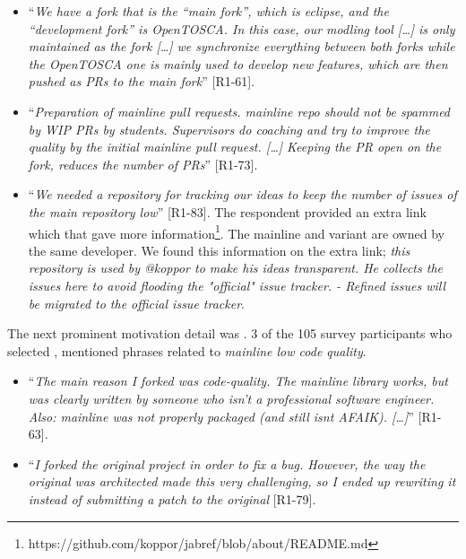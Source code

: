 \begin{itemize}[leftmargin=*]
\item ``\emph{We have a fork that is the ``main fork'', which is eclipse, and the ``development fork'' is OpenTOSCA. In this case, our modling tool [\ldots] is only maintained as the fork [\ldots] we synchronize everything between both forks while the OpenTOSCA one is mainly used to develop new features, which are then pushed as PRs to the main fork}'' [R1-61].

\item ``\emph{Preparation of mainline pull requests. mainline repo should not be spammed by WIP PRs by students. Supervisors do coaching and try to improve the quality by the initial mainline pull request. [\dots] Keeping the PR open on the fork, reduces the number of PRs}'' [R1-73].

\item ``\emph{We needed a repository for tracking our ideas to keep the number of issues of the main repository low}'' [R1-83]. The respondent provided an extra link which that gave more information\footnote{https://github.com/koppor/jabref/blob/about/README.md}. The mainline and variant are owned by the same developer. We found this information on the extra link; \emph{this repository is used by @koppor to make his ideas transparent. He collects the issues here to avoid flooding the "official" issue tracker. - Refined issues will be migrated to the official issue tracker}.
\end{itemize}

\nd The next prominent  motivation detail was .
3 of the 105 survey participants who selected , mentioned phrases related to \emph{mainline low code quality}.

\begin{itemize}[leftmargin=*]
\item ``\emph{The main reason I forked was code-quality. The mainline library works, but was clearly written by someone who isn't a professional software engineer. Also: mainline was not properly packaged (and still isnt AFAIK). [\ldots]}'' [R1-63].

\item ``\emph{I forked the original project in order to fix a bug. However, the way the original was architected made this very challenging, so I ended up rewriting it instead of submitting a patch to the original} [R1-79].
\end{itemize}


